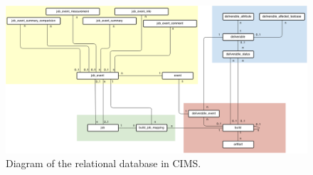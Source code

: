 \begin{figure}[h!]
\centering
\includegraphics[scale=0.5, angle=90]{figure/sql.png}
\caption{Diagram of the relational database in CIMS.}
\label{fig:sql}
\end{figure}


